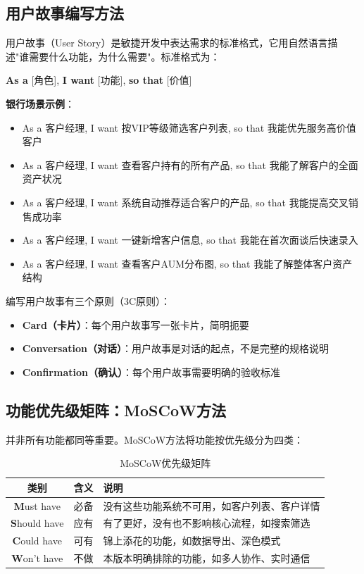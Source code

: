 \subsection{用户故事编写方法}

用户故事（User Story）是敏捷开发中表达需求的标准格式，它用自然语言描述"谁需要什么功能，为什么需要"。标准格式为：

\begin{center}
\textbf{As a} [角色], \textbf{I want} [功能], \textbf{so that} [价值]
\end{center}

\textbf{银行场景示例}：

\begin{itemize}[leftmargin=2em]
  \item As a 客户经理, I want 按VIP等级筛选客户列表, so that 我能优先服务高价值客户
  \item As a 客户经理, I want 查看客户持有的所有产品, so that 我能了解客户的全面资产状况
  \item As a 客户经理, I want 系统自动推荐适合客户的产品, so that 我能提高交叉销售成功率
  \item As a 客户经理, I want 一键新增客户信息, so that 我能在首次面谈后快速录入
  \item As a 客户经理, I want 查看客户AUM分布图, so that 我能了解整体客户资产结构
\end{itemize}

编写用户故事有三个原则（3C原则）：
\begin{itemize}[leftmargin=2em]
  \item \textbf{Card（卡片）}：每个用户故事写一张卡片，简明扼要
  \item \textbf{Conversation（对话）}：用户故事是对话的起点，不是完整的规格说明
  \item \textbf{Confirmation（确认）}：每个用户故事需要明确的验收标准
\end{itemize}

\subsection{功能优先级矩阵：MoSCoW方法}

并非所有功能都同等重要。MoSCoW方法将功能按优先级分为四类：

\begin{table}[H]
\centering
\begin{tabular}{clp{7cm}}
\toprule
\textbf{类别} & \textbf{含义} & \textbf{说明} \\
\midrule
\textbf{M}ust have & 必备 & 没有这些功能系统不可用，如客户列表、客户详情 \\
\textbf{S}hould have & 应有 & 有了更好，没有也不影响核心流程，如搜索筛选 \\
\textbf{C}ould have & 可有 & 锦上添花的功能，如数据导出、深色模式 \\
\textbf{W}on't have & 不做 & 本版本明确排除的功能，如多人协作、实时通信 \\
\bottomrule
\end{tabular}
\caption{MoSCoW优先级矩阵}
\end{table}

